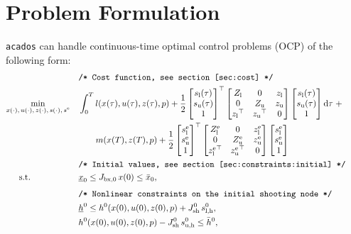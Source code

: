 \documentclass[english]{article}
\newcommand{\acados}{\texttt{acados}}
\newcommand{\tran}{^\top}
\newcommand{\ind}[1]{_{\textrm{#1}}}
\newcommand{\terminal}{^{\textrm{e}}}
\newcommand{\initial}{^{\textrm{0}}}
\newcommand{\matr}[1]{\begin{bmatrix}#1\end{bmatrix}}
\newcommand{\Lower}{\ind{l}}
\newcommand{\lowerh}{\ind{l,h}}
\newcommand{\upper}{\ind{u}}
\newcommand{\mathComment}[1]{\texttt{/* #1 */}}
\begin{document}
%
\section{Problem Formulation}\label{sec:problem}
%
\acados{} can handle continuous-time optimal control problems (OCP) of the following form:
%
\begin{align}
    &&&\mathComment{Cost function, see section \ref{sec:cost}}\nonumber\\
    &\underset{\begin{subarray}{c}
        x(\cdot),\,u(\cdot), \, z(\cdot), \, s(\cdot), \, s\terminal
        \end{subarray}}{\min}
    &&\int_0^T l(x(\tau), u(\tau), z(\tau), p)
     + \frac{1}{2} \matr{s\Lower(\tau) \\ s\upper(\tau) \\ 1} \tran
      \matr{ Z\Lower & 0 & z\Lower \\
      0 & Z\upper & z\upper \\
        {z\Lower}\tran & {z\upper}\tran & 0}
    \matr{s\Lower(\tau) \\ s\upper(\tau) \\ 1} \mathrm{d}\tau \; + \nonumber\\
     &&& \quad \quad m(x(T), z(T), p) +
      \frac{1}{2} \matr{s\Lower\terminal \\ s\upper\terminal \\ 1} \tran
     \matr{ Z\Lower\terminal & 0 & z\Lower\terminal \\
         0 & Z\upper\terminal & z\upper\terminal \\
         {z\Lower\terminal}\tran & {z\upper\terminal}\tran & 0}
     \matr{s\Lower\terminal \\ s\upper\terminal \\ 1}
     \label{eq:cost}\\
    &&&\mathComment{Initial values, see section \ref{sec:constraints:initial}}\nonumber\\
    &\,\,\,\quad \text{s.t.}    &&\underline{x}_0 \leq J_{\textrm{bx},0} \, x(0) \leq \bar{x}_0 , && \label{eq:constraints:initial}\\[1ex]
    &&&\mathComment{Nonlinear constraints on the initial shooting node} \nonumber\\
    &&&\underline{h}\initial \leq h\initial(x(0), u(0), z(0), p) + J_{\textrm{sh}}\initial \, s\lowerh\initial, &&\label{eq:constraints:path:lower_bounds:start}\\
    &&& h\initial(x(0), u(0),  z(0), p) - J\ind{sh}\initial\, s\ind{u,h}\initial \leq \bar{h}\initial, &&\label{eq:constraints:path:upper_bounds:start}\\

\end{align}
\end{document}
